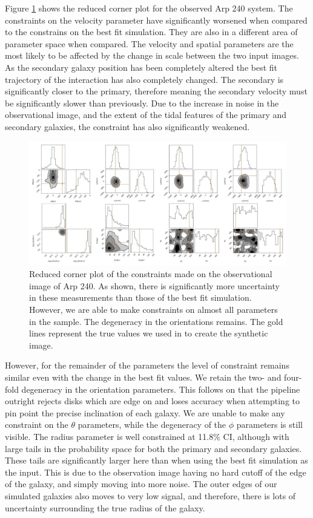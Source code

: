 Figure \ref{fig:obs_corner_plot} shows the reduced corner plot for the observed Arp 240 system. The constraints on the velocity parameter have significantly worsened when compared to the constrains on the best fit simulation. They are also in a different area of parameter space when compared. The velocity and spatial parameters are the most likely to be affected by the change in scale between the two input images. As the secondary galaxy position has been completely altered the best fit trajectory of the interaction has also completely changed. The secondary is significantly closer to the primary, therefore meaning the secondary velocity must be significantly slower than previously. Due to the increase in noise in the observational image, and the extent of the tidal features of the primary and secondary galaxies, the constraint has also significantly weakened.

\begin{figure}
    \centering
    \includegraphics[width=\textwidth]{Chapter1/figures/Arp240_obs-red-corner.pdf}
    \caption{Reduced corner plot of the constraints made on the observational image of Arp 240. As shown, there is significantly more uncertainty in these measurements than those of the best fit simulation. However, we are able to make constraints on almost all parameters in the sample. The degeneracy in the orientations remains. The gold lines represent the true values we used in to create the synthetic image.}
    \label{fig:obs_corner_plot}
\end{figure}

However, for the remainder of the parameters the level of constraint remains similar even with the change in the best fit values. We retain the two- and four-fold degeneracy in the orientation parameters. This follows on that the pipeline outright rejects disks which are edge on and loses accuracy when attempting to pin point the precise inclination of each galaxy. We are unable to make any constraint on the $\theta$ parameters, while the degeneracy of the $\phi$ parameters is still visible. The radius parameter is well constrained at 11.8\% CI, although with large tails in the probability space for both the primary and secondary galaxies. These tails are significantly larger here than when using the best fit simulation as the input. This is due to the observation image having no hard cutoff of the edge of the galaxy, and simply moving into more noise. The outer edges of our simulated galaxies also moves to very low signal, and therefore, there is lots of uncertainty surrounding the true radius of the galaxy. 

